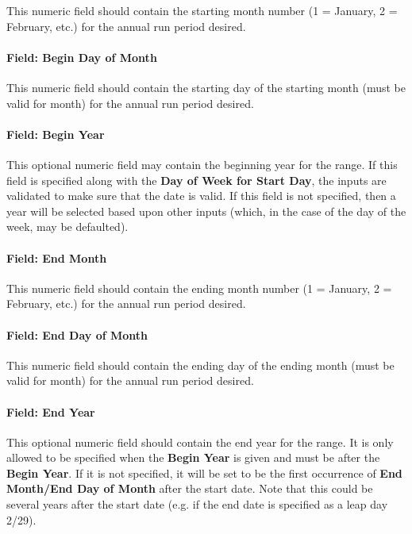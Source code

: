 This numeric field should contain the starting month number (1 = January, 2 = February, etc.) for the annual
run period desired.

\paragraph{Field: Begin Day of Month}\label{field-begin-day-of-month-2}

This numeric field should contain the starting day of the starting month (must be valid for month) for the
annual run period desired.

\paragraph{Field: Begin Year}\label{field-begin-year}

This optional numeric field may contain the beginning year for the range. If this field is specified
along with the \textbf{Day of Week for Start Day}, the inputs are validated to make sure that the date is
valid. If this field is not specified, then a year will be selected based upon other inputs (which, in the
case of the day of the week, may be defaulted).

\paragraph{Field: End Month}\label{field-end-month-2}

This numeric field should contain the ending month number (1 = January, 2 = February, etc.) for the annual
run period desired.

\paragraph{Field: End Day of Month}\label{field-end-day-of-month-2}

This numeric field should contain the ending day of the ending month (must be valid for month) for the
annual run period desired.

\paragraph{Field: End Year}\label{field-end-year}

This optional numeric field should contain the end year for the range. It is only allowed to be specified
when the \textbf{Begin Year} is given and must be after the \textbf{Begin Year}. If it is not specified,
it will be set to be the first occurrence of \textbf{End Month/End Day of Month} after the start date. Note
that this could be several years after the start date (e.g. if the end date is specified as a leap day 2/29).

